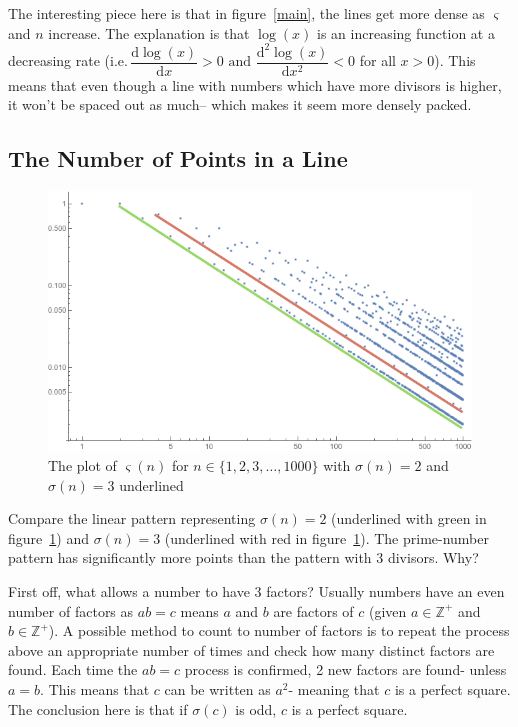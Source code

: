\documentclass[12pt]{article}
\begin{document}
			The interesting piece here is that in figure~\ref{main}, the lines get more dense as $\varsigma$ and $n$ increase. The explanation is that $\log(x)$ is an increasing function at a decreasing rate (i.e.\,$\dfrac{\mathrm{d}\log(x)}{\mathrm{d}x}>0 \text{ and } \dfrac{\mathrm{d}^2\log(x)}{\mathrm{d}x^2}<0$ for all $x>0$). This means that even though a line with numbers which have more divisors is higher, it won't be spaced out as much-- which makes it seem more densely packed.
		\subsection{The Number of Points in a Line}
			\begin{figure}[H]
				\includegraphics[width=\textwidth]{../Images/HLPlot.png}
				\caption{The plot of $\varsigma(n)$ for $n\in\{1,2,3,\ldots,1000\}$ with $\sigma(n)=2$ and $\sigma(n)=3$ underlined\label{HLPlot}}
			\end{figure}
			Compare the linear pattern representing $\sigma(n)=2$ (underlined with green in figure~\ref{HLPlot}) and $\sigma(n)=3$ (underlined with red in figure~\ref{HLPlot}). The prime-number pattern has significantly more points than the pattern with 3 divisors. Why?

			First off, what allows a number to have 3 factors?
			Usually numbers have an even number of factors as $ab=c$ means $a$ and $b$ are factors of $c$ (given $a\in\mathbb{Z^+}$ and $b\in\mathbb{Z^+}$). A possible method to count to number of factors is to repeat the process above an appropriate number of times and check how many distinct factors are found. Each time the $ab=c$ process is confirmed, 2 new factors are found- unless $a=b$. This means that $c$ can be written as $a^2$- meaning that $c$ is a perfect square. The conclusion here is that if $\sigma(c)$ is odd, $c$ is a perfect square.
\end{document}
